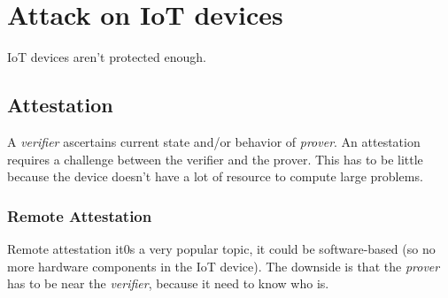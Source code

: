 \chapter{Attack on IoT devices}

IoT devices aren't protected enough.
\section{Attestation}
A \textit{verifier} ascertains current state and/or behavior of 
\textit{prover}. An attestation requires a challenge between the verifier and 
the prover. This has to be little because the device doesn't have a lot of 
resource to compute large problems.
\subsection{Remote Attestation}
Remote attestation it0s a very popular topic, it could be software-based (so no 
more hardware components in the IoT device). The downside is that the 
\textit{prover} has to be near the \textit{verifier}, because it need to know 
who is.